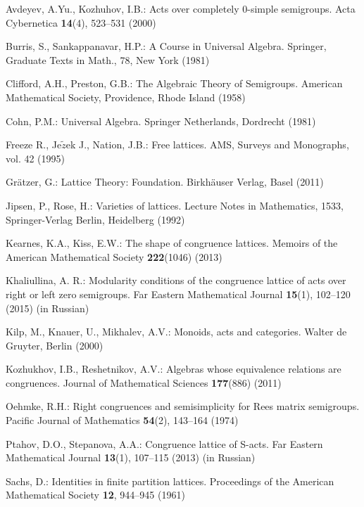 \documentclass{birkau}
\numberwithin{equation}{section}
\theoremstyle{plain}
\theoremstyle{definition}
\begin{document}
	
	\begin{thebibliography}{99}

         Avdeyev, A.Yu., Kozhuhov, I.B.:
        Acts over completely 0-simple semigroups.
        Acta Cybernetica \textbf{14}(4), 523--531 (2000)

         Burris, S., Sankappanavar, H.P.: A Course in Universal Algebra. Springer, Graduate Texts in Math., 78, New York (1981)

        Clifford, A.H., Preston, G.B.:
        The Algebraic Theory of Semigroups.
        American  Mathematical  Society,  Providence, Rhode  Island (1958)

        Cohn, P.M.:
        Universal Algebra.
        Springer Netherlands, Dordrecht (1981)

        Freeze R., Je$\tilde{z}$ek J., Nation, J.B.: Free lattices. AMS, Surveys and Monographs, vol. 42 (1995)

        Gr\"atzer, G.:
        Lattice Theory: Foundation.
        Birkh\"auser Verlag, Basel (2011)

         Jipsen, P., Rose, H.: Varieties of lattices. Lecture Notes in Mathematics, 1533, Springer-Verlag Berlin, Heidelberg (1992)

         Kearnes, K.A., Kiss, E.W.: The shape of congruence lattices. Memoirs of the American Mathematical Society \textbf{222}(1046) (2013)

        Khaliullina, A. R.:
        Modularity conditions of the congruence lattice of acts over right or left zero semigroups.
        Far Eastern Mathematical Journal \textbf{15}(1), 102--120 (2015) (in Russian)

        Kilp, M., Knauer, U., Mikhalev, A.V.:
        Monoids, acts and categories. Walter de Gruyter, Berlin (2000)

        Kozhukhov, I.B., Reshetnikov, A.V.:
        Algebras whose equivalence relations are congruences.
        Journal of Mathematical Sciences \textbf{177}(886) (2011)

        Oehmke, R.H.:
        Right congruences and semisimplicity for Rees matrix semigroups.
        Pacific Journal of Mathematics \textbf{54}(2), 143--164 (1974)

        Ptahov, D.O., Stepanova, A.A.:
        Congruence lattice of S-acts.
        Far Eastern Mathematical Journal
        \textbf{13}(1), 107--115 (2013) (in Russian)

        Sachs, D.:
        Identities in finite partition lattices.
        Proceedings of the American Mathematical Society
        \textbf{12}, 944--945 (1961)
	
	\end{thebibliography}
	
\end{document}
